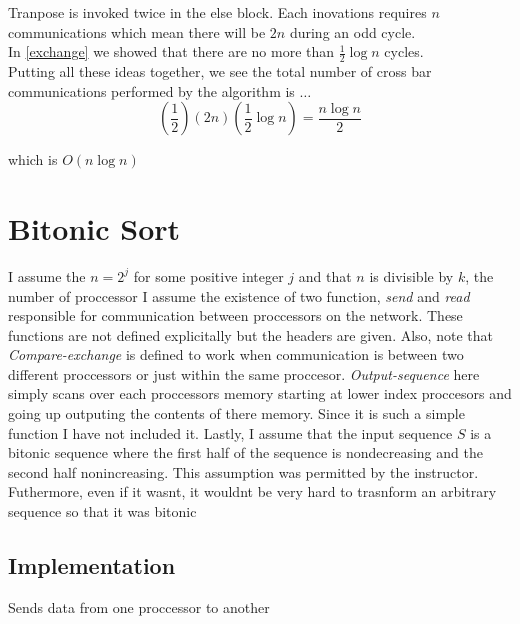 \documentclass[12pt]{article}
\begin{document}
\noindent
Tranpose is invoked twice in the else block. Each inovations requires $n$ communications 
which mean there will be $2n$ during an odd cycle. \\

\noindent
In \ref{exchange} we showed that there are no more than $\frac1{2}\log n$
cycles.  \\

\noindent
Putting all these ideas together, we see the total number of cross bar communications performed by
the algorithm is $\ldots$ 
$$(\frac1{2})(2n)(\frac1{2}\log n) = \frac{n \log n}{2}$$

which is $O(n \log n)$
\newpage

\section{Bitonic Sort}
I assume the $n=2^j$ for some positive integer $j$ and that $n$ is divisible by $k$, the number of proccessor
I assume the existence of two function, \textit{send} and \textit{read} responsible for communication
between proccessors on the network. These functions are not defined 
explicitally but the headers are given. Also, note that \textit{Compare-exchange} is defined to work
when communication is between two different proccessors or just within the same proccesor.
\textit{Output-sequence} here simply scans over each proccessors memory starting at lower index
proccesors and going up outputing the contents of there memory. Since it is such a simple function
I have not included it.
Lastly, I assume that the input sequence $S$ is a bitonic sequence where the first half of the sequence 
is nondecreasing and the second half nonincreasing. This assumption was permitted by the instructor. 
Futhermore, even if it wasnt, it wouldnt be very hard to trasnform an arbitrary sequence so that 
it was bitonic

\subsection{Implementation}
\begin{algorithm}[]
	\SetAlgoLined
	\DontPrintSemicolon
	\LinesNumbered 
	\caption{Sends data from one proccessor to another}
\end{algorithm}
\end{document}

